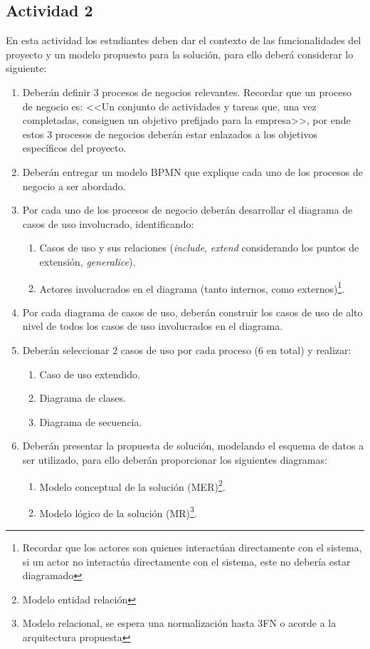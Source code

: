 \documentclass[]{article}
\begin{document}
\subsection{Actividad 2}

En esta actividad los estudiantes deben dar el contexto de las funcionalidades del proyecto y un modelo propuesto para la solución, para ello deberá considerar lo siguiente:

\begin{enumerate}
    \item Deberán definir 3 procesos de negocios relevantes. Recordar que un proceso de negocio es: <<Un conjunto de actividades y tareas que, una vez completadas, consiguen un objetivo prefijado
    para la empresa>>, por ende estos 3 procesos de negocios deberán estar enlazados a los objetivos específicos del proyecto.
    \item Deberán entregar un modelo BPMN que explique cada uno de los procesos de negocio a ser abordado.
    \item Por cada uno de los procesos de negocio deberán desarrollar el diagrama de casos de uso involucrado, identificando:
    \begin{enumerate}
        \item Casos de uso y sus relaciones (\textit{include}, \textit{extend} considerando los puntos de extensión, \textit{generalice}).
        \item Actores involucrados en el diagrama (tanto internos, como externos)\footnote{Recordar que los actores son quienes interactúan directamente con el sistema, si un actor no interactúa directamente 
        con el sistema, este no debería estar diagramado}.
    \end{enumerate}
    \item Por cada diagrama de casos de uso, deberán construir los casos de uso de alto nivel de todos los casos de uso involucrados en el diagrama.
    \item Deberán seleccionar 2 casos de uso por cada proceso (6 en total) y realizar:
    \begin{enumerate}
        \item Caso de uso extendido.
        \item Diagrama de clases.
        \item Diagrama de secuencia.
    \end{enumerate}
    \item Deberán presentar la propuesta de solución, modelando el esquema de datos a ser utilizado, para ello deberán proporcionar los siguientes diagramas:
    \begin{enumerate}
        \item Modelo conceptual de la solución (MER)\footnote{Modelo entidad relación}.
        \item Modelo lógico de la solución (MR)\footnote{Modelo relacional, se espera una normalización hasta 3FN o acorde a la arquitectura propuesta}.
    \end{enumerate}
\end{enumerate}
\end{document}
